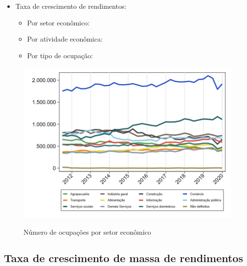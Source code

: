 \documentclass[8pt]{beamer}
\begin{document}
\begin{frame}[label=indice_principal_amz_urbana]{}
\begin{itemize}
\item{Taxa de crescimento de rendimentos:
	\begin{itemize}
	\item{Por setor econômico: \hyperlink{amzurbanarkngtxrendaporsetor}{}}
	\item{Por atividade econômica: \hyperlink{amzurbanarkngtxrendaporatividade}{}}
	\item{Por tipo de ocupação: \hyperlink{amzurbanarkngtxrendaporocupacao}{}}
	\end{itemize}
}
\vspace{1mm}

\end{itemize}

\end{frame}

\begin{frame}
\textit{\hyperlink{indice_principal_amz_urbana}{}}
\begin{figure}
  \centering
  \includegraphics[width=.85\linewidth]{./../analysis/output/_amz_urbana_importancia_relativa.png}
  \label{_amz_urbana_importancia_relativa}
  \caption{{Número de ocupações por setor econômico}}
\end{figure}
\end{frame}

\subsection{Taxa de crescimento de massa de rendimentos}

\begin{frame}
\textit{\hyperlink{indice_principal_amz_urbana}{}}

\end{frame}
\end{document}
